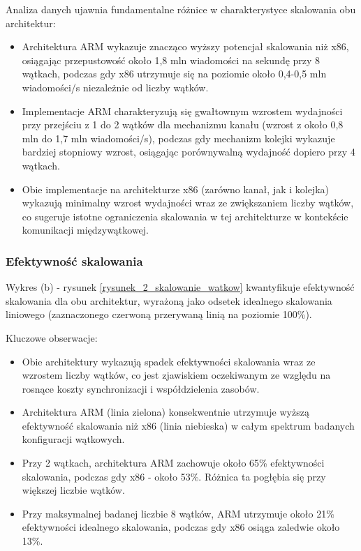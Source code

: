Analiza danych ujawnia fundamentalne różnice w charakterystyce skalowania obu architektur:
\begin{itemize}
    \item Architektura ARM wykazuje znacząco wyższy potencjał skalowania niż x86, osiągając przepustowość około 1,8 mln wiadomości na sekundę przy 8 wątkach, podczas gdy x86 utrzymuje się na poziomie około 0,4-0,5 mln wiadomości/s niezależnie od liczby wątków.
    \item Implementacje ARM charakteryzują się gwałtownym wzrostem wydajności przy przejściu z 1 do 2 wątków dla mechanizmu kanału (wzrost z około 0,8 mln do 1,7 mln wiadomości/s), podczas gdy mechanizm kolejki wykazuje bardziej stopniowy wzrost, osiągając porównywalną wydajność dopiero przy 4 wątkach.
    \item Obie implementacje na architekturze x86 (zarówno kanał, jak i kolejka) wykazują minimalny wzrost wydajności wraz ze zwiększaniem liczby wątków, co sugeruje istotne ograniczenia skalowania w tej architekturze w kontekście komunikacji międzywątkowej.
\end{itemize}

\subsubsection{Efektywność skalowania}
Wykres (b) - rysunek \ref{rysunek_2_skalowanie_watkow} kwantyfikuje efektywność skalowania dla obu architektur, wyrażoną jako odsetek idealnego skalowania liniowego (zaznaczonego czerwoną przerywaną linią na poziomie 100\%).

Kluczowe obserwacje:
\begin{itemize}
    \item Obie architektury wykazują spadek efektywności skalowania wraz ze wzrostem liczby wątków, co jest zjawiskiem oczekiwanym ze względu na rosnące koszty synchronizacji i współdzielenia zasobów.
    \item Architektura ARM (linia zielona) konsekwentnie utrzymuje wyższą efektywność skalowania niż x86 (linia niebieska) w całym spektrum badanych konfiguracji wątkowych.
    \item Przy 2 wątkach, architektura ARM zachowuje około 65\% efektywności skalowania, podczas gdy x86 - około 53\%. Różnica ta pogłębia się przy większej liczbie wątków.
    \item Przy maksymalnej badanej liczbie 8 wątków, ARM utrzymuje około 21\% efektywności idealnego skalowania, podczas gdy x86 osiąga zaledwie około 13\%.
\end{itemize}

